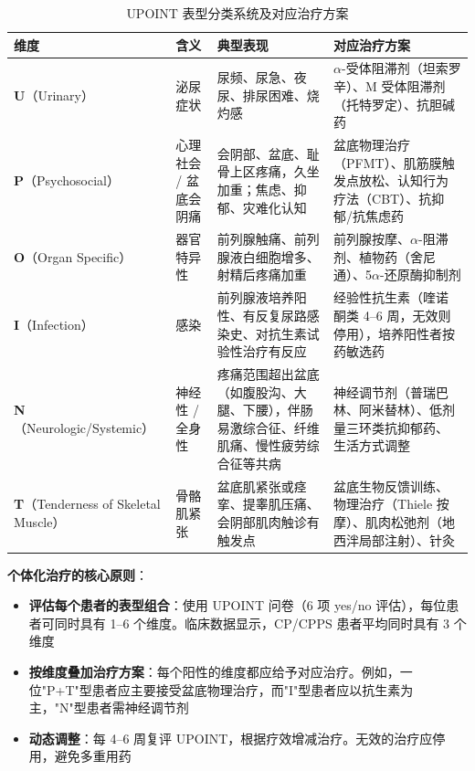 \begin{table}[htbp]
\centering
\caption{UPOINT 表型分类系统及对应治疗方案}
\label{tab:upoint}
\begin{tabularx}{\textwidth}{@{}llXX@{}}
    \toprule
    \textbf{维度} & \textbf{含义} & \textbf{典型表现} & \textbf{对应治疗方案} \\
    \midrule
    \textbf{U}（Urinary） & 泌尿症状 & 尿频、尿急、夜尿、排尿困难、烧灼感 & $\alpha$-受体阻滞剂（坦索罗辛）、M 受体阻滞剂（托特罗定）、抗胆碱药 \\
    \textbf{P}（Psychosocial） & 心理社会 / 盆底会阴痛 & 会阴部、盆底、耻骨上区疼痛，久坐加重；焦虑、抑郁、灾难化认知 & 盆底物理治疗（PFMT）、肌筋膜触发点放松、认知行为疗法（CBT）、抗抑郁/抗焦虑药 \\
    \textbf{O}（Organ Specific） & 器官特异性 & 前列腺触痛、前列腺液白细胞增多、射精后疼痛加重 & 前列腺按摩、$\alpha$-阻滞剂、植物药（舍尼通）、5$\alpha$-还原酶抑制剂 \\
    \textbf{I}（Infection） & 感染 & 前列腺液培养阳性、有反复尿路感染史、对抗生素试验性治疗有反应 & 经验性抗生素（喹诺酮类 4--6 周，无效则停用），培养阳性者按药敏选药 \\
    \textbf{N}（Neurologic/Systemic） & 神经性 / 全身性 & 疼痛范围超出盆底（如腹股沟、大腿、下腰），伴肠易激综合征、纤维肌痛、慢性疲劳综合征等共病 & 神经调节剂（普瑞巴林、阿米替林）、低剂量三环类抗抑郁药、生活方式调整 \\
    \textbf{T}（Tenderness of Skeletal Muscle） & 骨骼肌紧张 & 盆底肌紧张或痉挛、提睾肌压痛、会阴部肌肉触诊有触发点 & 盆底生物反馈训练、物理治疗（Thiele 按摩）、肌肉松弛剂（地西泮局部注射）、针灸 \\
    \bottomrule
\end{tabularx}
\end{table}

\vspace{0.5em}
\noindent\textbf{个体化治疗的核心原则}：

\begin{itemize}[leftmargin=2cm]
	\item \textbf{评估每个患者的表型组合}：使用 UPOINT 问卷（6 项 yes/no 评估），每位患者可同时具有 1--6 个维度。临床数据显示，CP/CPPS 患者平均同时具有 3 个维度
	\item \textbf{按维度叠加治疗方案}：每个阳性的维度都应给予对应治疗。例如，一位"P+T"型患者应主要接受盆底物理治疗，而"I"型患者应以抗生素为主，"N"型患者需神经调节剂
	\item \textbf{动态调整}：每 4--6 周复评 UPOINT，根据疗效增减治疗。无效的治疗应停用，避免多重用药
\end{itemize}

